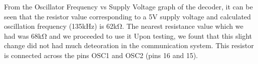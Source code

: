 \vspace*{.5cm}
From the Oscillator
Frequency vs Supply Voltage graph of the decoder, it can be seen that
the resistor value corresponding to a 5V supply voltage and
calculated oscillation frequency (135kHz) is 62kΩ. The nearest
resistance value which we had was 68kΩ and we proceeded to use it
Upon testing, we fount that this slight change did not had much deteoration
in the communication system. This resistor is connected across the pins OSC1 and OSC2 (pins 16 and 15).

